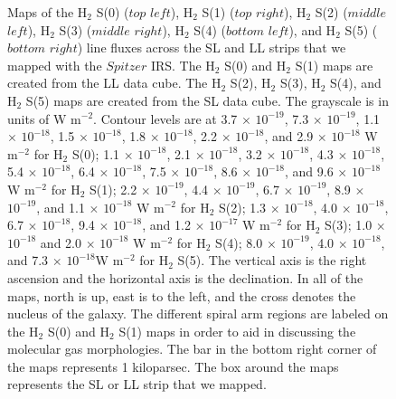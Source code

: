 \documentclass[12pt,preprint]{aastex}
\begin{document}
\clearpage


\begin{figure}
 \end{figure}
 \clearpage
 
 \begin{figure}
 \caption{Maps of the H$_2$ S(0) ($top$ $left$), H$_2$ S(1)
 ($top$ $right$), H$_2$ S(2) ($middle$ $left$), H$_2$ S(3) 
 ($middle$ $right$), H$_2$ S(4) ($bottom$ $left$), and H$_2$ 
 S(5) ($bottom$ $right$) line fluxes across the SL and LL strips that we mapped 
 with the $Spitzer$ IRS.  The H$_2$ S(0) and H$_2$ S(1) 
 maps are created from the LL data cube.    
The H$_2$ S(2), H$_2$ S(3), H$_2$ S(4), and 
H$_2$ S(5) maps are created from the SL data cube.  
The grayscale is in units of W $\mathrm{m^{-2}}$.  Contour levels are at 
3.7 $\times$ ${10^{-19}}$, 7.3 $\times$ ${10^{-19}}$, 1.1 $\times$ ${10^{-18}}$, 1.5 $\times$ ${10^{-18}}$, 1.8 $\times$ ${10^{-18}}$, 2.2 $\times$ ${10^{-18}}$, and 2.9 $\times$ ${10^{-18}}$ W $\mathrm{m^{-2}}$ for H$_2$ S(0); 
1.1 $\times$ ${10^{-18}}$, 2.1 $\times$ ${10^{-18}}$, 3.2 $\times$ ${10^{-18}}$, 4.3 $\times$ ${10^{-18}}$, 5.4 $\times$ ${10^{-18}}$, 6.4 $\times$ ${10^{-18}}$, 7.5 $\times$ ${10^{-18}}$, 8.6 $\times$ ${10^{-18}}$, and 9.6 $\times$ ${10^{-18}}$ W $\mathrm{m^{-2}}$ for H$_2$ S(1); 
2.2 $\times$ ${10^{-19}}$, 4.4 $\times$ ${10^{-19}}$,  6.7 $\times$ ${10^{-19}}$, 8.9 $\times$ ${10^{-19}}$, and 1.1 $\times$ ${10^{-18}}$ W $\mathrm{m^{-2}}$ for H$_2$ S(2);
1.3 $\times$ ${10^{-18}}$, 4.0 $\times$ ${10^{-18}}$, 6.7 $\times$ ${10^{-18}}$, 9.4 $\times$ ${10^{-18}}$, and 1.2 $\times$ ${10^{-17}}$ W $\mathrm{m^{-2}}$ for H$_2$ S(3);  
1.0 $\times$ ${10^{-18}}$ and 2.0 $\times$ ${10^{-18}}$ W $\mathrm{m^{-2}}$ for H$_2$ S(4); 
8.0 $\times$ ${10^{-19}}$, 4.0 $\times$ ${10^{-18}}$, and 7.3 $\times$ ${10^{-18}}$W $\mathrm{m^{-2}}$ for H$_2$ S(5).  
The vertical axis is the right ascension and the horizontal axis is the declination.  
In all of the maps, north is up, east is to the left, and the cross 
denotes the nucleus of the galaxy.  The different spiral 
arm regions are labeled on the H$_2$ S(0) and H$_2$ S(1) 
maps in order to aid in discussing the molecular gas morphologies.  
The bar in the bottom right corner of the maps 
represents 1 kiloparsec.  The box around 
the maps represents the SL or LL strip that we mapped.}
  \label{figure-2}
  \end{figure}
\end{document}
